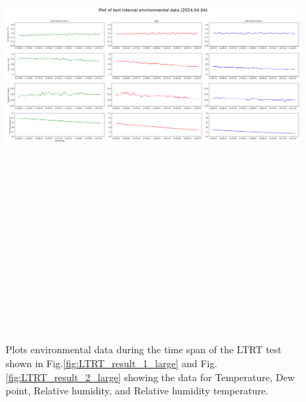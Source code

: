 \begin{figure}
    \centering
    \includegraphics[width=25cm,height=20cm,keepaspectratio]{Figures/results/env_plot_20240404.png}
    \caption{Plots environmental data during the time span of the LTRT test shown in Fig.\ref{fig:LTRT_result_1_large} and Fig.\ref{fig:LTRT_result_2_large} showing the data for Temperature, Dew point, Relative humidity, and Relative humidity temperature.}
    \label{fig:env_1_large}
\end{figure}

